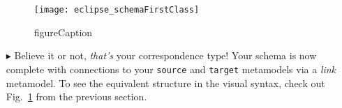 \begin{itemize}
\begin{figure}[htbp]
\begin{center}
  \texttt{[image: eclipse\_schemaFirstClass]}
  \caption{figureCaption}
  \label{fig:firstCorrType}
\end{center}
\end{figure}

\item[$\blacktriangleright$] Believe it or not, \emph{that's} your correspondence type! Your schema is now complete with connections to your \texttt{source} and
\texttt{target} metamodels via a \emph{link} metamodel. To see the equivalent structure in the visual syntax, check out Fig.~\ref{fig:firstCorrType} from the
previous section.

\end{itemize}
